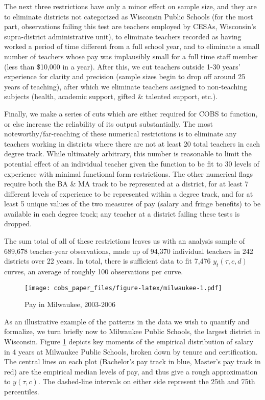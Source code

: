 \documentclass[]{article}
\begin{document}
The next three restrictions have only a minor effect on sample size, and
they are to eliminate districts not categorized as Wisconsin Public
Schools (for the most part, observations failing this test are teachers
employed by CESAs, Wisconsin's supra-district administrative unit), to
eliminate teachers recorded as having worked a period of time different
from a full school year, and to eliminate a small number of teachers
whose pay was implausibly small for a full time staff member (less than
\$10,000 in a year). After this, we cut teachers outside 1-30 years'
experience for clarity and precision (sample sizes begin to drop off
around 25 years of teaching), after which we eliminate teachers assigned
to non-teaching subjects (health, academic support, gifted \& talented
support, etc.).

Finally, we make a series of cuts which are either required for COBS to
function, or else increase the reliability of its output substantially.
The most noteworthy/far-reaching of these numerical restrictions is to
eliminate any teachers working in districts where there are not at least
20 total teachers in each degree track. While ultimately arbitrary, this
number is reasonable to limit the potential effect of an individual
teacher given the function to be fit to 30 levels of experience with
minimal functional form restrictions. The other numerical flags require
both the BA \& MA track to be represented at a district, for at least 7
different levels of experience to be represented within a degree track,
and for at least 5 unique values of the two measures of pay (salary and
fringe benefits) to be available in each degree track; any teacher at a
district failing these tests is dropped.

The sum total of all of these restrictions leaves us with an analysis
sample of 689,678 teacher-year observations, made up of 94,370
individual teachers in 242 districts over 22 years. In total, there is
sufficient data to fit 7,476 \(y_t(\tau, c, d)\) curves, an average of
roughly 100 observations per curve.

\begin{figure}[htbp]
\centering
\texttt{[image: cobs\_paper\_files/figure-latex/milwaukee-1.pdf]}
\caption{\label{fig:mwk}Pay in Milwaukee, 2003-2006}
\end{figure}

As an illustrative example of the patterns in the data we wish to
quantify and formalize, we turn briefly now to Milwaukee Public Schools,
the largest district in Wisconsin. Figure \ref{fig:mwk} depicts key
moments of the empirical distribution of salary in 4 years at Milwaukee
Public Schools, broken down by tenure and certification. The central
lines on each plot (Bachelor's pay track in blue, Master's pay track in
red) are the empirical median levels of pay, and thus give a rough
approximation to \(y(\tau, c)\). The dashed-line intervals on either
side represent the 25th and 75th percentiles.
\end{document}
